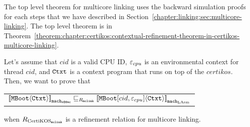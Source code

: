 The top level theorem for multicore linking uses the backward simulation proofs 
for each steps that we have described in Section~\ref{chapter:linking:sec:multicore-linking}.
The top level theorem is in Theorem~\ref{theorem:chapter:certikos:contextual-refinement-theorem-in-certikos-multicore-linking}.
\begin{theorem}
\label{theorem:chapter:certikos:contextual-refinement-theorem-in-certikos-multicore-linking}
Let's assume that $cid$ is a valid CPU ID, ${\varepsilon}_{cpu}$ is an
environmental context for thread $cid$, and ${\mathrm{\texttt{Ctxt}}}$ is a
 context program that runs on top of the $certikos$. 
 Then, we want to prove that 
 \begin{center}
\begin{tabular}{c}
${[\![{{\mathrm{\texttt{MBoot}}}} \langle {{\mathrm{\texttt{Ctxt}}}} \rangle]\!]}_{{\mathrm{\texttt{mach}}}_{{\mathrm{\texttt{x86mc}}}}} \sqsubseteq_{R_{{\mathrm{\texttt{mclink}}}}} {[\![{{\mathrm{\texttt{MBoot}}}[cid, {\varepsilon}_{cpu}]} \langle {{\mathrm{\texttt{Ctxt}}}} \rangle]\!]}_{{{\mathrm{\texttt{mach}}}_{\mathrm{LAsm}}}}$\\
\end{tabular}
\end{center}
when ${R_{\mathrm{CertiKOS}_{\mathrm{\texttt{mclink}}}}}$ is a refinement relation for multicore linking.
\end{theorem}
%



